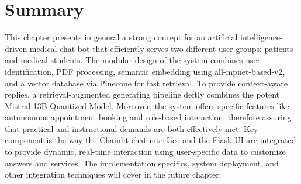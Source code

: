 \section{Summary}
\label{sec:methodology_summary}
This chapter presents in general a strong concept for an artificial intelligence-driven medical chat bot that efficiently serves two different user groups: patients and medical students.  The modular design of the system combines user identification, PDF processing, semantic embedding using all-mpnet-based-v2, and a vector database via Pinecone for fast retrieval.  To provide context-aware replies, a retrieval-augmented generating pipeline deftly combines the potent Mistral 13B Quantized Model.  Moreover, the system offers specific features like autonomous appointment booking and role-based interaction, therefore assuring that practical and instructional demands are both effectively met.  Key component is the way the Chainlit chat interface and the Flask UI are integrated to provide dynamic, real-time interaction using user-specific data to customize answers and services.  The implementation specifics, system deployment, and other integration techniques will cover in the future chapter.


